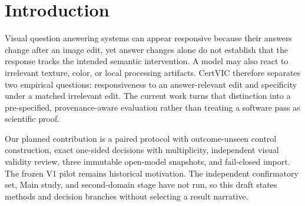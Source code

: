 \section{Introduction}
Visual question answering systems can appear responsive because their answers change after an image
edit, yet answer changes alone do not establish that the response tracks the intended semantic
intervention. A model may also react to irrelevant texture, color, or local processing artifacts.
CertVIC therefore separates two empirical questions: responsiveness to an answer-relevant edit and
specificity under a matched irrelevant edit. The current work turns that distinction into a
pre-specified, provenance-aware evaluation rather than treating a software pass as scientific proof.

Our planned contribution is a paired protocol with outcome-unseen control construction, exact
one-sided decisions with multiplicity, independent visual validity review, three immutable open-model
snapshots, and fail-closed import. The frozen V1 pilot remains historical motivation. The independent
confirmatory set, Main study, and second-domain stage have not run, so this draft states methods and
decision branches without selecting a result narrative.
